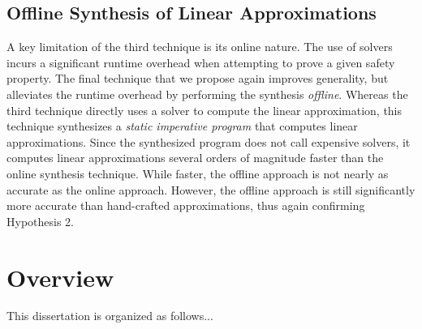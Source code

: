 \subsection{Offline Synthesis of Linear Approximations}
A key limitation of the third technique is its online nature. The use of solvers
incurs a significant runtime overhead when attempting to prove a given safety
property. The final technique that we propose again improves generality, but
alleviates the runtime overhead by performing the synthesis \textit{offline}.
Whereas the third technique directly uses a solver to compute the linear
approximation, this technique synthesizes a \textit{static imperative program}
that computes linear approximations. Since the synthesized program does not call
expensive solvers, it computes linear approximations several orders of magnitude
faster than the online synthesis technique. While faster, the offline approach is
not nearly as accurate as the online approach. However, the offline approach is
still significantly more accurate than hand-crafted approximations, thus again
confirming Hypothesis 2.

\section{Overview}
This dissertation is organized as follows...
